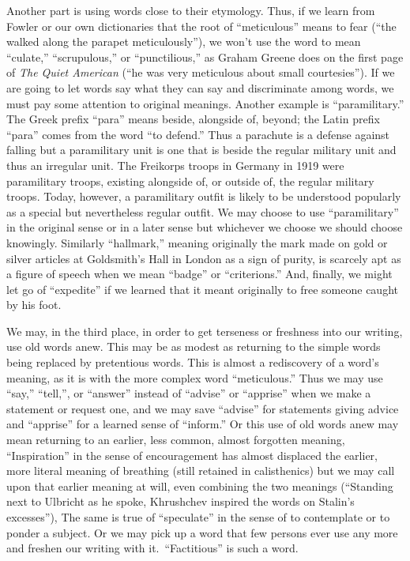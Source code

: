 \documentclass[
    oneside,
    11pt,
    draft
]{memoir}
\begin{document}
Another part is using words close to their etymology. Thus, if we learn from Fowler or our own dictionaries that the root of \enquote{meticulous} means to fear (\enquote{the walked along the parapet meticulously}), we won't use the word to mean \enquote{culate,} \enquote{scrupulous,} or \enquote{punctilious,} as Graham Greene does on the first page of \emph{The Quiet American} (\enquote{he was very meticulous about small courtesies}). If we are going to let words say what they can say and discriminate among words, we must pay some attention to original meanings. Another example is \enquote{paramilitary.} The Greek prefix \enquote{para} means beside, alongside of, beyond; the Latin prefix \enquote{para} comes from the word \enquote{to defend.} Thus a parachute is a defense against falling but a paramilitary unit is one that is beside the regular military unit and thus an irregular unit. The Freikorps troops in Germany in 1919 were paramilitary troops, existing alongside of, or outside of, the regular military troops. Today, however, a paramilitary outfit is likely to be understood popularly as a special but nevertheless regular outfit. We may choose to use \enquote{paramilitary} in the original sense or in a later sense but whichever we choose we should choose knowingly. Similarly \enquote{hallmark,} meaning originally the mark made on gold or silver articles at Goldsmith's Hall in London as a sign of purity, is scarcely apt as a figure of speech when we mean \enquote{badge} or \enquote{criterions.} And, finally, we might let go of \enquote{expedite} if we learned that it meant originally to free someone caught by his foot.

We may, in the third place, in order to get terseness or freshness into our writing, use old words anew. This may be as modest as returning to the simple words being replaced by pretentious words. This is almost a rediscovery of a word's meaning, as it is with the more complex word \enquote{meticulous.} Thus we may use \enquote{say,} \enquote{tell,}, or \enquote{answer} instead of \enquote{advise} or \enquote{apprise} when we make a statement or request one, and we may save \enquote{advise} for statements giving advice and \enquote{apprise} for a learned sense of \enquote{inform.} Or this use of old words anew may mean returning to an earlier, less common, almost forgotten meaning, \enquote{Inspiration} in the sense of encouragement has almost displaced the earlier, more literal meaning of breathing (still retained in calisthenics) but we may call upon that earlier meaning at will, even combining the two meanings (\enquote{Standing next to Ulbricht as he spoke, Khrushchev inspired the words on Stalin's excesses}), The same is true of \enquote{speculate} in the sense of to contemplate or to ponder a subject. Or we may pick up a word that few persons ever use any more and freshen our writing with it.\ \enquote{Factitious} is such a word.
\end{document}
